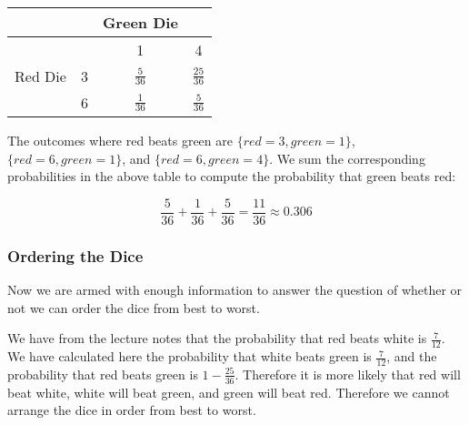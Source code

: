 \documentclass[a4paper,11pt]{article}
\begin{document}
\begin{center}
  \begin{tabular}{ | c | c | c | c| }
    \hline
     & & Green Die & \\ \hline
    & & 1 & 4 \\ \hline
    Red Die & 3 & $\frac{5}{36}$ & $\frac{25}{36}$\\ \hline
     & 6 & $\frac{1}{36}$ & $\frac{5}{36}$ \\ \hline
  \end{tabular}
\end{center}

The outcomes where red beats green are $\{red=3,green=1\}$, 
$\{red=6, green=1\}$, and $\{red=6, green=4\}$.  We sum 
the corresponding probabilities in the above table to compute
the probability that green beats red:

\begin{equation}
\frac{5}{36} + \frac{1}{36} + \frac{5}{36} = \frac{11}{36}
\approx 0.306
\end{equation}

\subsubsection{Ordering the Dice}
Now we are armed with enough information to answer the question 
of whether or not we can order the dice from best to worst.

We have from the lecture notes that the probability that red beats
white is $\frac{7}{12}$.  We have calculated here the probability that
white beats green is $\frac{7}{12}$, and the probability that red
beats green is $1-\frac{25}{36}$.  Therefore it is more likely that
red will beat white, white will beat green, and green will beat red.
Therefore we cannot arrange the dice in order from best to worst.

\printbibliography
\end{document}
